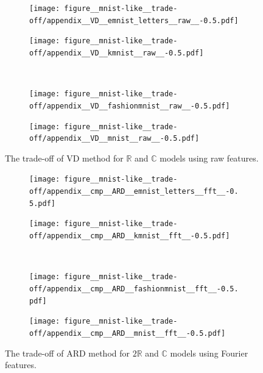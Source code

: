 \documentclass[a4paper]{extarticle}
\newcommand{\real}{\mathbb{R}}
\newcommand{\cplx}{\mathbb{C}}
\begin{document}
\begin{figure}[ht]
  \centering
  \begin{subfigure}[b]{0.5\textwidth}
    \centering
    \texttt{[image: figure\_\_mnist-like\_\_trade-off/appendix\_\_VD\_\_emnist\_letters\_\_raw\_\_-0.5.pdf]}
  \end{subfigure}%
  \begin{subfigure}[b]{0.5\textwidth}
    \centering
    \texttt{[image: figure\_\_mnist-like\_\_trade-off/appendix\_\_VD\_\_kmnist\_\_raw\_\_-0.5.pdf]}
  \end{subfigure} \\%
  \begin{subfigure}[b]{0.5\textwidth}
    \centering
    \texttt{[image: figure\_\_mnist-like\_\_trade-off/appendix\_\_VD\_\_fashionmnist\_\_raw\_\_-0.5.pdf]}
  \end{subfigure}%
  \begin{subfigure}[b]{0.5\textwidth}
    \centering
    \texttt{[image: figure\_\_mnist-like\_\_trade-off/appendix\_\_VD\_\_mnist\_\_raw\_\_-0.5.pdf]}
  \end{subfigure}
  \caption{%
    The trade-off of VD method for $\real$ and $\cplx$ models using raw features.
  }
  \label{fig:appendix__mnist-like__trade-off__VD__raw}
\end{figure}

\begin{figure}[ht]
  \centering
  \begin{subfigure}[b]{0.5\textwidth}
    \centering
    \texttt{[image: figure\_\_mnist-like\_\_trade-off/appendix\_\_cmp\_\_ARD\_\_emnist\_letters\_\_fft\_\_-0.5.pdf]}
  \end{subfigure}%
  \begin{subfigure}[b]{0.5\textwidth}
    \centering
    \texttt{[image: figure\_\_mnist-like\_\_trade-off/appendix\_\_cmp\_\_ARD\_\_kmnist\_\_fft\_\_-0.5.pdf]}
  \end{subfigure} \\ %
  \begin{subfigure}[b]{0.5\textwidth}
    \centering
    \texttt{[image: figure\_\_mnist-like\_\_trade-off/appendix\_\_cmp\_\_ARD\_\_fashionmnist\_\_fft\_\_-0.5.pdf]}
  \end{subfigure}%
  \begin{subfigure}[b]{0.5\textwidth}
    \centering
    \texttt{[image: figure\_\_mnist-like\_\_trade-off/appendix\_\_cmp\_\_ARD\_\_mnist\_\_fft\_\_-0.5.pdf]}
  \end{subfigure}
  \caption{%
    The trade-off of ARD method for $2\real$ and $\cplx$ models using Fourier features.
  }
  \label{fig:appendix__cmp__mnist-like__trade-off__ARD__fft}
\end{figure}
\end{document}
